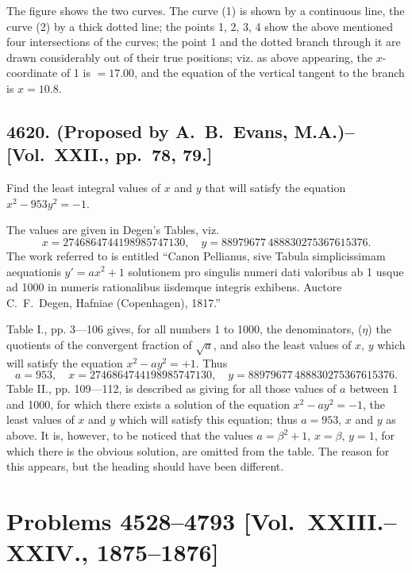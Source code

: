 \documentclass[11pt,a4paper]{book}
\begin{document}
\begin{solution}
The figure shows the two curves. The curve (1) is shown by a continuous line, the curve (2) by a thick dotted line; the points 1, 2, 3, 4 show the above mentioned four intersections of the curves; the point 1 and the dotted branch through it are drawn considerably out of their true positions; viz. as above appearing, the $x$-coordinate of 1 is $=17.00$, and the equation of the vertical tangent to the branch is $x=10.8$.
\end{solution}

\newpage

\subsection*{4620. (Proposed by A.~B.~Evans, M.A.)\---[Vol.~XXII., pp.~78, 79.]}

Find the least integral values of $x$ and $y$ that will satisfy the equation $x^2 - 953y^2 = -1$.

\begin{solution}
The values are given in Degen's Tables, viz.
\[
x = 2746864744198985747130, \quad y = 88979677\,488830275367615376.
\]
The work referred to is entitled ``Canon Pellianus, sive Tabula simplicissimam aequationis $y' = ax^2+1$ solutionem pro singulis numeri dati valoribus ab 1 usque ad 1000 in numeris rationalibus iisdemque integris exhibens. Auctore C.~F.~Degen, Hafniae (Copenhagen), 1817.''

Table I., pp. 3---106 gives, for all numbers 1 to 1000, the denominators, ($\eta$) the quotients of the convergent fraction of $\sqrt{a}$, and also the least values of $x$, $y$ which will satisfy the equation $x^2 - ay^2 = +1$. Thus
\[
a=953, \quad x = 2746864744198985747130, \quad y = 88979677\,488830275367615376.
\]
Table II., pp. 109---112, is described as giving for all those values of $a$ between 1 and 1000, for which there exists a solution of the equation $x^2 - ay^2 = -1$, the least values of $x$ and $y$ which will satisfy this equation; thus $a=953$, $x$ and $y$ as above. It is, however, to be noticed that the values $a = \beta^2+1$, $x=\beta$, $y=1$, for which there is the obvious solution, are omitted from the table. The reason for this appears, but the heading should have been different.
\end{solution}

\newpage

\section*{Problems 4528--4793 [Vol.~XXIII.--XXIV., 1875--1876]}
\end{document}
